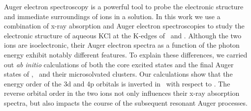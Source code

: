 Auger electron spectroscopy is a powerful tool to probe the electronic structure and immediate surroundings of ions in a solution. In this work we use a combination of x-ray absorption and Auger electron spectroscopies to study the electronic structure of aqueous KCl at the K-edges of \ki~and \cli. Although the two ions are isoelectronic, their Auger electron spectra as a function of the photon energy exhibit notably different features. To explain these differences, we carried out {\it ab initio} calculations of both the core excited states and the final Auger states of \ki, \cli~and their microsolvated clusters. Our calculations show that the energy order of the 3d and 4p orbitals is inverted in \ki~with respect to \cli. The reverse orbital order in the two ions not only influences their x-ray absorption spectra, but also impacts the course of the subsequent resonant Auger processes.